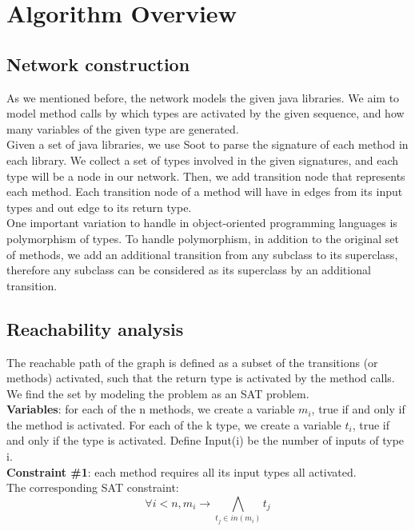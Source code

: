 \documentclass[twocolumn]{article}
\begin{document}
\section{Algorithm Overview}
\subsection{Network construction}

As we mentioned before, the network models the given java libraries. We aim to model method calls by which types are activated by the given sequence, and how many variables of the given type are generated.\\

Given a set of java libraries, we use Soot to parse the signature of each method in each library. We collect a set of types involved in the given signatures, and each type will be a node in our network. Then, we add transition node that represents each method. Each transition node of a method will have in edges from its input types and out edge to its return type.\\

One important variation to handle in object-oriented programming languages is polymorphism of types. To handle polymorphism, in addition to the original set of methods, we add an additional transition from any subclass to its superclass, therefore any subclass can be considered as its superclass by an additional transition.\\

\subsection{Reachability analysis}
The reachable path of the graph is defined as a subset of the transitions (or methods) activated, such that the return type is activated by the method calls. We find the set by modeling the problem as an SAT problem.\\

\textbf{Variables}: for each of the n methods, we create a variable $m_i$, true if and only if the method is activated. For each of the k type, we create a variable $t_i$, true if and only if the type is activated. Define Input(i) be the number of inputs of type i.\\

\textbf{Constraint \#1}: each method requires all its input types all activated.\\
The corresponding SAT constraint: $$\forall i < n, m_i \rightarrow \bigwedge_{t_j \in in(m_i)} t_j$$
\end{document}
